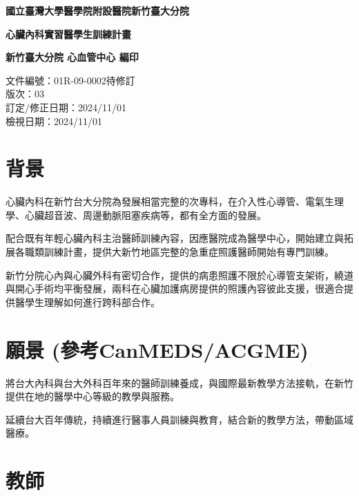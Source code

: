 \documentclass[12pt,a4paper]{article}
\begin{document}
\begin{titlepage}
    \centering
    {\LARGE\textcolor{header_red}{\textbf{國立臺灣大學醫學院附設醫院新竹臺大分院}}\par}
    \vspace{2cm}
    {\huge\bfseries 心臟內科實習醫學生訓練計畫\par}
    \vspace{4cm}
    
    \begin{tcolorbox}[
        colback=header_blue!5!white,
        colframe=header_blue,
        width=0.8\textwidth,
        arc=10pt,
        boxrule=1pt
    ]
    \centering
    {\large\textbf{新竹臺大分院 心血管中心 編印}}\par
    \vspace{0.5cm}
    \end{tcolorbox}
    
    \vfill
    {\large 文件編號：01R-09-0002待修訂\\
    版次：03\\
    訂定/修正日期：2024/11/01\\
    檢視日期：2024/11/01\par}
\end{titlepage}

\tableofcontents
\clearpage

\section{背景}
心臟內科在新竹台大分院為發展相當完整的次專科，在介入性心導管、電氣生理學、心臟超音波、周邊動脈阻塞疾病等，都有全方面的發展。

配合既有年輕心臟內科主治醫師訓練內容，因應醫院成為醫學中心，開始建立與拓展各職類訓練計畫，提供大新竹地區完整的急重症照護醫師開始有專門訓練。

新竹分院心內與心臟外科有密切合作，提供的病患照護不限於心導管支架術，繞道與開心手術均平衡發展，兩科在心臟加護病房提供的照護內容彼此支援，很適合提供醫學生理解如何進行跨科部合作。

\section{願景 (參考CanMEDS/ACGME)}
將台大內科與台大外科百年來的醫師訓練養成，與國際最新教學方法接軌，在新竹提供在地的醫學中心等級的教學與服務。

延續台大百年傳統，持續進行醫事人員訓練與教育，結合新的教學方法，帶動區域醫療。

\section{教師}
\end{document}
